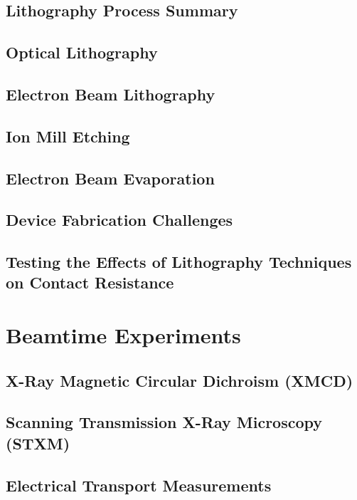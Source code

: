\subsection{Lithography Process Summary}

\subsection{Optical Lithography}

\subsection{Electron Beam Lithography}

\subsection{Ion Mill Etching}

\subsection{Electron Beam Evaporation}

\subsection{Device Fabrication Challenges}

\subsection{Testing the Effects of Lithography Techniques on Contact Resistance}

\section{Beamtime Experiments}
\subsection{X-Ray Magnetic Circular Dichroism (XMCD)}

\subsection{Scanning Transmission X-Ray Microscopy (STXM)}

\subsection{Electrical Transport Measurements}
